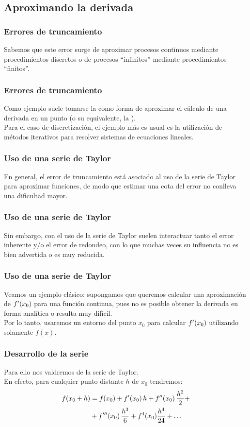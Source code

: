\documentclass[12pt]{beamer}
\begin{document}
\subsection{Aproximando la derivada}

\begin{frame}
\frametitle{Errores de truncamiento}
Sabemos que este error surge de aproximar procesos continuos mediante procedimientos discretos o de procesos \enquote{infinitos} mediante procedimientos \enquote{finitos}.
\end{frame}
\begin{frame}
\frametitle{Errores de truncamiento}
Como ejemplo suele tomarse la \emph{} como forma de aproximar el cálculo de una derivada en un punto (o su equivalente, la \emph{}).
\\
\bigskip
\pause
Para el caso de discretización, el ejemplo más es usual es la utilización de métodos iterativos para resolver sistemas de ecuaciones lineales.
\end{frame}
\begin{frame}
\frametitle{Uso de una serie de Taylor}
En general, el error de truncamiento está asociado al uso de la serie de Taylor para aproximar funciones, de modo que estimar una cota del error no conlleva una dificultad mayor.
\end{frame}
\begin{frame}
\frametitle{Uso de una serie de Taylor}
Sin embargo, con el uso de la serie de Taylor suelen interactuar tanto el error inherente y/o el error de redondeo, con lo que muchas veces su influencia no es bien advertida o es muy reducida. 
\end{frame}
\begin{frame}
\frametitle{Uso de una serie de Taylor}
Veamos un ejemplo clásico: supongamos que queremos calcular una aproximación de ${f}^{\prime} (x_{0})$ para una función continua, pues no es posible obtener la derivada en forma analítica o resulta muy difícil.
\\
\bigskip
\pause
Por lo tanto, usaremos un entorno del punto $x_{0}$ para calcular ${f}^{\prime} (x_{0})$ utilizando solamente $f (x)$.
\end{frame}
\begin{frame}
\frametitle{Desarrollo de la serie}
Para ello nos valdremos de la serie de Taylor.
\\
\bigskip
\pause
En efecto, para cualquier punto distante $h$ de $x_{0}$ tendremos:
\pause
\begin{align*}
f (x_{0} + h) &= f(x_{0}) + {f}^{\prime} (x_{0}) \, h + {f}^{\prime \prime} (x_{0}) \, \dfrac{h^{2}}{2} + \\
&+ {f}^{\prime \prime \prime} (x_{0}) \, \dfrac{h^{3}}{6} + f^{4}(x_{0}) \dfrac{h^{4}}{24} + \ldots
\end{align*}
\end{frame}
\end{document}
